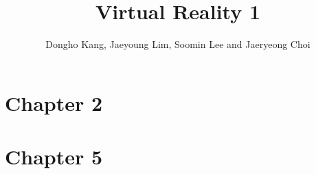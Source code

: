 \documentclass[12pt]{article}
\title{Virtual Reality 1}
\author{Dongho Kang, Jaeyoung Lim, Soomin Lee and Jaeryeong Choi}
\begin{document}
 

\maketitle

\section{Chapter 2}

\newpage


\section{Chapter 5}
\end{document}
